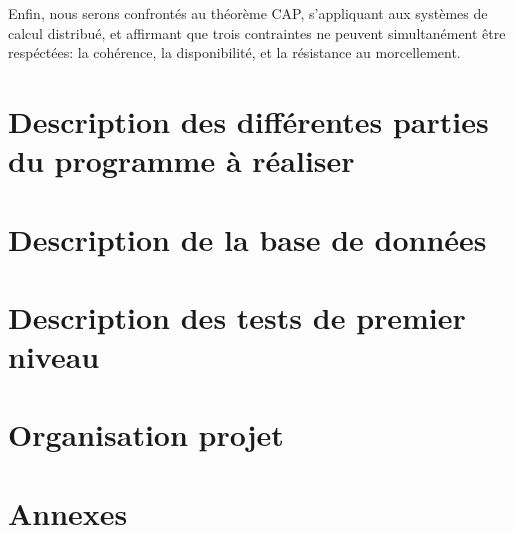 \documentclass[12pt]{report}
\begin{document}
Enfin, nous serons confrontés au théorème CAP, s'appliquant aux systèmes de calcul distribué, et affirmant que trois contraintes ne peuvent simultanément être respéctées: la cohérence, la disponibilité, et la résistance au morcellement.

\chapter{Description des différentes parties du programme à réaliser}
\thispagestyle{EIP} %

\chapter{Description de la base de données}
\thispagestyle{EIP} %

\chapter{Description des tests de premier niveau}
\thispagestyle{EIP} %

\chapter{Organisation projet}
\thispagestyle{EIP} %

\chapter{Annexes}
\thispagestyle{EIP} %
\end{document}
